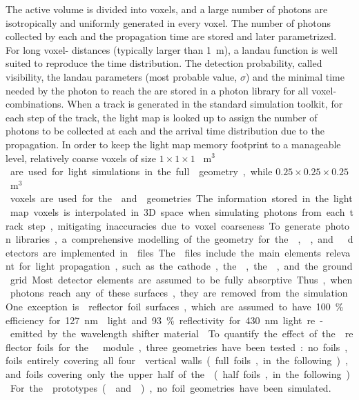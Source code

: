 The active volume is divided into voxels, and a large number of photons are isotropically and uniformly generated in every voxel. The number of photons collected by each  and the propagation time are stored and later parametrized. For long voxel- distances (typically larger than \SI{1}{\m}), a landau function is well suited to reproduce the time distribution. The detection probability, called visibility, the landau parameters (most probable value, $\sigma$) and the minimal time needed by the photon to reach the  are stored in a photon library for all voxel- combinations. When a track is generated in the standard \dual {} simulation toolkit, for each step of the track, the light map is looked up to assign the number of photons to be collected at each  and the arrival time distribution due to the propagation. In order to keep the light map memory footprint to a manageable level, relatively coarse voxels of size $1\times 1\times 1$ \SI{}{m$^3$} are used for light simulations in the full  geometry, while $0.25\times 0.25\times 0.25$ \SI{}{m$^3$} voxels are used for the  and  geometries. The information stored in the light map voxels is interpolated in 3D space when simulating photons from each track step,  mitigating inaccuracies due to voxel coarseness.

To generate photon libraries, a comprehensive modelling of the geometry for the , , and   detectors are implemented in  files. The  files include the main elements relevant for light propagation, such as the cathode, the , the , and the ground grid. Most detector elements are assumed to be fully absorptive. Thus, when photons reach any of these surfaces, they are removed from the simulation. One exception is  reflector foil surfaces, which are assumed to have \SI{100}{\%}  efficiency for \SI{127}{\nm}  light and 93\% reflectivity for \SI{430}{\nm} light re-emitted by the wavelength shifter material \cite{Francini:2013lua}. To quantify the effect of the  reflector foils for the   module, three geometries have been tested: no foils, foils entirely covering all four  vertical walls (full foils, in the following), and foils covering only the upper half of the  (half foils, in the following). For the  prototypes ( and ), no foil geometries have been simulated.

